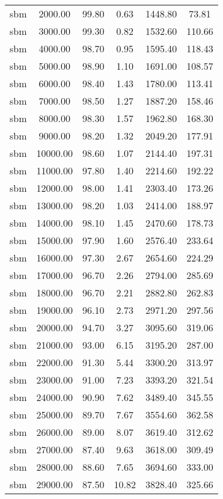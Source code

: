 \begin{table}[ht]
\begin{table}[ht]
\begin{tabular}{|cccccc}
  sbm & 2000.00 & 99.80 & 0.63 & 1448.80 & 73.81 \\ 
  sbm & 3000.00 & 99.30 & 0.82 & 1532.60 & 110.66 \\ 
  sbm & 4000.00 & 98.70 & 0.95 & 1595.40 & 118.43 \\ 
  sbm & 5000.00 & 98.90 & 1.10 & 1691.00 & 108.57 \\ 
  sbm & 6000.00 & 98.40 & 1.43 & 1780.00 & 113.41 \\ 
  sbm & 7000.00 & 98.50 & 1.27 & 1887.20 & 158.46 \\ 
  sbm & 8000.00 & 98.30 & 1.57 & 1962.80 & 168.30 \\ 
  sbm & 9000.00 & 98.20 & 1.32 & 2049.20 & 177.91 \\ 
  sbm & 10000.00 & 98.60 & 1.07 & 2144.40 & 197.31 \\ 
  sbm & 11000.00 & 97.80 & 1.40 & 2214.60 & 192.22 \\ 
  sbm & 12000.00 & 98.00 & 1.41 & 2303.40 & 173.26 \\ 
  sbm & 13000.00 & 98.20 & 1.03 & 2414.00 & 188.97 \\ 
  sbm & 14000.00 & 98.10 & 1.45 & 2470.60 & 178.73 \\ 
  sbm & 15000.00 & 97.90 & 1.60 & 2576.40 & 233.64 \\ 
  sbm & 16000.00 & 97.30 & 2.67 & 2654.60 & 224.29 \\ 
  sbm & 17000.00 & 96.70 & 2.26 & 2794.00 & 285.69 \\ 
  sbm & 18000.00 & 96.70 & 2.21 & 2882.80 & 262.83 \\ 
  sbm & 19000.00 & 96.10 & 2.73 & 2971.20 & 297.56 \\ 
  sbm & 20000.00 & 94.70 & 3.27 & 3095.60 & 319.06 \\ 
  sbm & 21000.00 & 93.00 & 6.15 & 3195.20 & 287.00 \\ 
  sbm & 22000.00 & 91.30 & 5.44 & 3300.20 & 313.97 \\ 
  sbm & 23000.00 & 91.00 & 7.23 & 3393.20 & 321.54 \\ 
  sbm & 24000.00 & 90.90 & 7.62 & 3489.40 & 345.55 \\ 
  sbm & 25000.00 & 89.70 & 7.67 & 3554.60 & 362.58 \\ 
  sbm & 26000.00 & 89.00 & 8.07 & 3619.40 & 312.62 \\ 
  sbm & 27000.00 & 87.40 & 9.63 & 3618.00 & 309.49 \\ 
  sbm & 28000.00 & 88.60 & 7.65 & 3694.60 & 333.00 \\ 
  sbm & 29000.00 & 87.50 & 10.82 & 3828.40 & 325.66 \\ 

\end{tabular}
\end{table}
\end{table}
